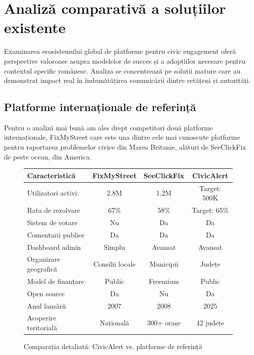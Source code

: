 \documentclass[12pt,a4paper]{report}
\begin{document}
\section{Analiză comparativă a soluțiilor existente}


Examinarea ecosistemului global de platforme pentru civic engagement oferă perspective valoroase asupra modelelor de succes și a adopțiilor necesare pentru contextul specific românesc. Analiza se concentrează pe soluții mature care au demonstrat impact real în îmbunătățirea comunicării dintre cetățeni și autorități.

\subsection{Platforme internaționale de referință}

Pentru o analiză mai bună am ales drept competitori două platforme internaționale, FixMyStreet care este una dintre cele mai cunoscute platforme pentru raportarea problemelor civice din Marea Britanie, alături de SeeClickFix de peste ocean, din America.

\begin{figure}[H]
\centering
\begin{tabular}{|l|c|c|c|}
\hline
\textbf{Caracteristică} & \textbf{FixMyStreet} & \textbf{SeeClickFix} & \textbf{CivicAlert} \\
\hline
Utilizatori activi & 2.8M & 1.2M & Target: 500K \\
\hline
Rata de rezolvare & 67\% & 58\% & Target: 65\% \\
\hline
Sistem de votare & Nu & Da & Da \\
\hline
Comentarii publice & Da & Da & Da \\
\hline
Dashboard admin & Simplu & Avansat & Avansat \\
\hline
Organizare geografică & Consilii locale & Municipii & Județe \\
\hline
Model de finanțare & Public & Freemium & Public \\
\hline
Open source & Da & Nu & Da \\
\hline
Anul lansării & 2007 & 2008 & 2025 \\
\hline
Acoperire teritorială & Națională & 300+ orașe & 42 județe \\
\hline
\end{tabular}
\caption{Comparația detaliată: CivicAlert vs. platforme de referință}
\label{tab:comparatie_detaliata}
\end{figure}
\end{document}
